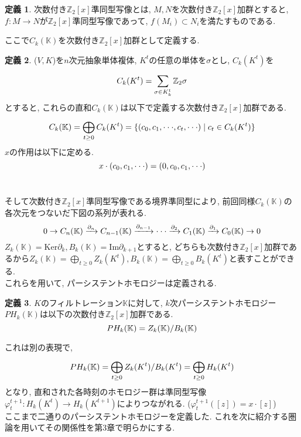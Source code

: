 \documentclass[a4paper]{jsarticle}
\theoremstyle{definition}
\newtheorem{dfn}{定義}[section]
\newcommand{\Ker}{{\mathrm{Ker}}}
\newcommand{\Image}{{\mathrm{Im}}}
\begin{document}
\begin{dfn}
    次数付き$\mathbb{Z}_2[x]$準同型写像とは, $M, N$を次数付き$\mathbb{Z}_2[x]$加群とすると, $f:M\rightarrow N$が$\mathbb{Z}_2[x]$準同型写像であって, $f(M_i)\subset N_i$を満たすものである.\\
\end{dfn}
ここで$C_k(\mathbb{K})$を次数付き$\mathbb{Z}_2[x]$加群として定義する.
\begin{dfn}
    ($V,K$)を$n$次元抽象単体複体, $K^t$の任意の単体を$\sigma$とし, $C_k(K^t)$を
    \begin{equation}
        C_k(K^t)=\sum_{\sigma\in K_k^t}^{} \mathbb{Z}_2 \sigma \notag
    \end{equation}
    とすると, これらの直和$C_k(\mathbb{K})$は以下で定義する次数付き$\mathbb{Z}_2[x]$加群である.
    \begin{equation}
        C_k(\mathbb{K})=\bigoplus_{t\geq 0}^{}C_k(K^t)=\{(c_0, c_1, \cdot\cdot\cdot,c_t, \cdot\cdot\cdot)\;|\;c_t\in C_k(K^t) \} \notag
    \end{equation}
    $x$の作用は以下に定める.
    \begin{equation}
        x \cdot (c_0, c_1, \cdot\cdot\cdot)= (0, c_0, c_1, \cdot\cdot\cdot) \notag
    \end{equation}\\
\end{dfn}
そして次数付き$\mathbb{Z}_2[x]$準同型写像である境界準同型により, 前回同様$C_k(\mathbb{K})$の各次元をつないだ下図の系列が表れる.
\begin{equation}
    0\rightarrow C_n(\mathbb{K})\xrightarrow[]{\partial_n} C_{n-1}(\mathbb{K})\xrightarrow[]{\partial_{n-1}}\cdot\cdot\cdot\xrightarrow[]{\partial_2} C_1(\mathbb{K})\xrightarrow[]{\partial_1} C_0(\mathbb{K})\rightarrow 0\notag
\end{equation}
$Z_k(\mathbb{K})=\Ker \partial_k, B_k(\mathbb{K})=\Image \partial_{k+1}$とすると, どちらも次数付き$\mathbb{Z}_2[x]$加群であるから$Z_k(\mathbb{K})=\bigoplus_{t\geq 0}^{}Z_k(K^t), B_k(\mathbb{K})=\bigoplus_{t\geq 0}^{}B_k(K^t)$と表すことができる.\\
これらを用いて, パーシステントホモロジーは定義される.
\begin{dfn}
    $K$のフィルトレーション$\mathbb{K}$に対して, $k$次パーシステントホモロジー$PH_k(\mathbb{K})$は以下の次数付き$\mathbb{Z}_2[x]$加群である.
    \begin{equation}
        PH_k(\mathbb{K})=Z_k(\mathbb{K})/B_k(\mathbb{K})\notag
    \end{equation}
\end{dfn}
これは別の表現で,
\begin{equation}
        PH_k(\mathbb{K})=\bigoplus_{t\geq 0}^{}Z_k(K^t)/B_k(K^t)=\bigoplus_{t\geq 0}^{}H_k(K^t)
        \notag
\end{equation}
となり, 直和された各時刻のホモロジー群は準同型写像$\varphi_t^{t+1}:H_k(K^t)\rightarrow H_k(K^{t+1})$によりつながれる. ($\varphi_t^{t+1}([z])=x\cdot [z]$)\\
ここまで二通りのパーシステントホモロジーを定義した. これを次に紹介する圏論を用いてその関係性を第3章で明らかにする.
\end{document}

